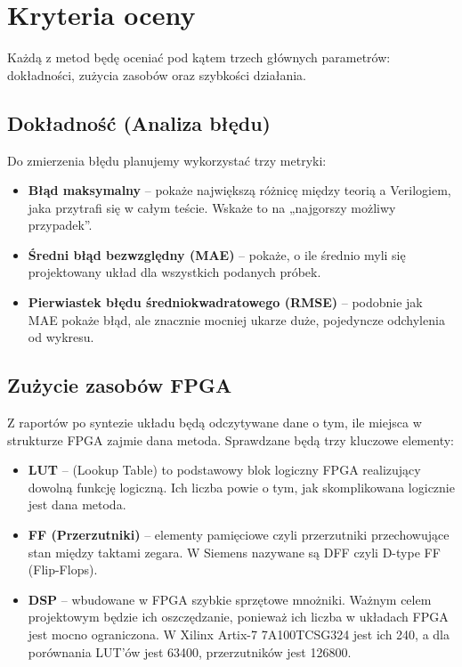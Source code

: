 \documentclass[12pt, a4paper, oneside]{scrreprt}
\begin{document}
\section{Kryteria oceny}
Każdą z metod będę oceniać pod kątem trzech głównych parametrów: dokładności, zużycia zasobów oraz szybkości działania.

\subsection{Dokładność (Analiza błędu)}
Do zmierzenia błędu planujemy wykorzystać trzy metryki:
\begin{itemize}
    \item \textbf{Błąd maksymalny} -- pokaże największą różnicę między teorią a Verilogiem, jaka przytrafi się w całym teście. Wskaże to na „najgorszy możliwy przypadek”.
    \item \textbf{Średni błąd bezwzględny (MAE)} -- pokaże, o ile średnio myli się projektowany układ dla wszystkich podanych próbek.
    \item \textbf{Pierwiastek błędu średniokwadratowego (RMSE)} -- podobnie jak MAE pokaże błąd, ale znacznie mocniej ukarze duże, pojedyncze odchylenia od wykresu.
\end{itemize}

\subsection{Zużycie zasobów FPGA}
Z raportów po syntezie układu będą odczytywane dane o tym, ile miejsca w strukturze FPGA zajmie dana metoda. Sprawdzane będą trzy kluczowe elementy:
\begin{itemize}
    \item \textbf{LUT} -- (Lookup Table) to podstawowy blok logiczny FPGA realizujący dowolną funkcję logiczną. Ich liczba powie o tym, jak skomplikowana logicznie jest dana metoda.
    \item \textbf{FF (Przerzutniki)} -- elementy pamięciowe czyli przerzutniki przechowujące stan między taktami zegara. W Siemens nazywane są DFF czyli D-type FF (Flip-Flops).
    \item \textbf{DSP} -- wbudowane w FPGA szybkie sprzętowe mnożniki. Ważnym celem projektowym będzie ich oszczędzanie, ponieważ ich liczba w układach FPGA jest mocno ograniczona. W Xilinx Artix-7 7A100TCSG324 jest ich 240, a dla porównania LUT'ów jest 63400, przerzutników jest 126800.
\end{itemize}
\end{document}
